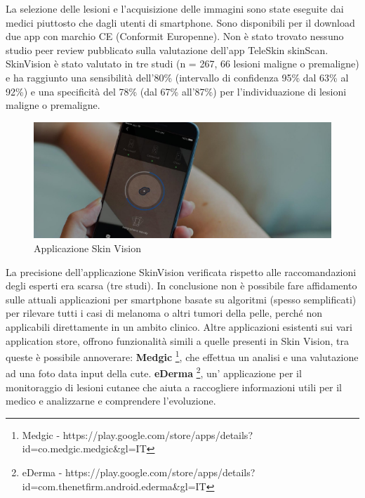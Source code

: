 {	La selezione delle lesioni e l'acquisizione delle immagini sono state eseguite dai medici piuttosto che dagli utenti di smartphone. Sono disponibili per il download due app con marchio CE (Conformit Europenne). Non è stato trovato nessuno studio peer review pubblicato sulla valutazione dell'app TeleSkin skinScan. SkinVision è stato valutato in tre studi (n = 267, 66 lesioni maligne o premaligne) e ha raggiunto una sensibilità dell'80\% (intervallo di confidenza 95\% dal 63\% al 92\%) e una specificità del 78\% (dal 67\% all'87\%) per l'individuazione di lesioni maligne o premaligne.
	\begin{figure}[h]
		\begin{center}     
			\includegraphics[scale=0.30]{figure/capitolo2/skinvision1.jpg}
		\end{center}
		\caption{Applicazione Skin Vision}	
	\end{figure}
	\newline
	La precisione dell'applicazione SkinVision verificata rispetto alle raccomandazioni degli esperti era scarsa (tre studi).
	\newline
	In conclusione non è possibile fare affidamento sulle attuali applicazioni per smartphone basate su algoritmi (spesso semplificati) per rilevare tutti i casi di melanoma o altri tumori della pelle, perché non applicabili direttamente in un ambito clinico. 
	\newline
	\newline
	Altre applicazioni esistenti sui vari application store, offrono funzionalità simili a quelle presenti in Skin Vision, tra queste è possibile annoverare:
	\newline
\textbf{Medgic} \footnote{Medgic - https://play.google.com/store/apps/details?id=co.medgic.medgic\&gl=IT}, che effettua un analisi e una valutazione ad una foto data input della cute.
	\newline
\textbf{eDerma} \footnote{eDerma - https://play.google.com/store/apps/details?id=com.thenetfirm.android.ederma\&gl=IT}, un' applicazione per il monitoraggio di lesioni cutanee che aiuta a raccogliere informazioni utili per il medico e analizzarne e comprendere l'evoluzione.
}
